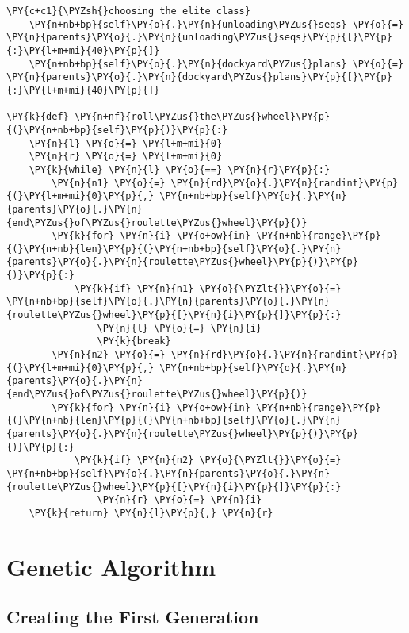 \begin{tcolorbox}[breakable, size=fbox, boxrule=1pt, pad at break*=1mm,colback=cellbackground, colframe=cellborder]
\begin{Verbatim}[commandchars=\\\{\}]
    \PY{c+c1}{\PYZsh{}choosing the elite class}
    \PY{n+nb+bp}{self}\PY{o}{.}\PY{n}{unloading\PYZus{}seqs} \PY{o}{=} \PY{n}{parents}\PY{o}{.}\PY{n}{unloading\PYZus{}seqs}\PY{p}{[}\PY{p}{:}\PY{l+m+mi}{40}\PY{p}{]}
    \PY{n+nb+bp}{self}\PY{o}{.}\PY{n}{dockyard\PYZus{}plans} \PY{o}{=} \PY{n}{parents}\PY{o}{.}\PY{n}{dockyard\PYZus{}plans}\PY{p}{[}\PY{p}{:}\PY{l+m+mi}{40}\PY{p}{]}

\PY{k}{def} \PY{n+nf}{roll\PYZus{}the\PYZus{}wheel}\PY{p}{(}\PY{n+nb+bp}{self}\PY{p}{)}\PY{p}{:}
    \PY{n}{l} \PY{o}{=} \PY{l+m+mi}{0}
    \PY{n}{r} \PY{o}{=} \PY{l+m+mi}{0}
    \PY{k}{while} \PY{n}{l} \PY{o}{==} \PY{n}{r}\PY{p}{:}
        \PY{n}{n1} \PY{o}{=} \PY{n}{rd}\PY{o}{.}\PY{n}{randint}\PY{p}{(}\PY{l+m+mi}{0}\PY{p}{,} \PY{n+nb+bp}{self}\PY{o}{.}\PY{n}{parents}\PY{o}{.}\PY{n}{end\PYZus{}of\PYZus{}roulette\PYZus{}wheel}\PY{p}{)}
        \PY{k}{for} \PY{n}{i} \PY{o+ow}{in} \PY{n+nb}{range}\PY{p}{(}\PY{n+nb}{len}\PY{p}{(}\PY{n+nb+bp}{self}\PY{o}{.}\PY{n}{parents}\PY{o}{.}\PY{n}{roulette\PYZus{}wheel}\PY{p}{)}\PY{p}{)}\PY{p}{:}
            \PY{k}{if} \PY{n}{n1} \PY{o}{\PYZlt{}}\PY{o}{=} \PY{n+nb+bp}{self}\PY{o}{.}\PY{n}{parents}\PY{o}{.}\PY{n}{roulette\PYZus{}wheel}\PY{p}{[}\PY{n}{i}\PY{p}{]}\PY{p}{:}
                \PY{n}{l} \PY{o}{=} \PY{n}{i}
                \PY{k}{break}
        \PY{n}{n2} \PY{o}{=} \PY{n}{rd}\PY{o}{.}\PY{n}{randint}\PY{p}{(}\PY{l+m+mi}{0}\PY{p}{,} \PY{n+nb+bp}{self}\PY{o}{.}\PY{n}{parents}\PY{o}{.}\PY{n}{end\PYZus{}of\PYZus{}roulette\PYZus{}wheel}\PY{p}{)}
        \PY{k}{for} \PY{n}{i} \PY{o+ow}{in} \PY{n+nb}{range}\PY{p}{(}\PY{n+nb}{len}\PY{p}{(}\PY{n+nb+bp}{self}\PY{o}{.}\PY{n}{parents}\PY{o}{.}\PY{n}{roulette\PYZus{}wheel}\PY{p}{)}\PY{p}{)}\PY{p}{:}
            \PY{k}{if} \PY{n}{n2} \PY{o}{\PYZlt{}}\PY{o}{=} \PY{n+nb+bp}{self}\PY{o}{.}\PY{n}{parents}\PY{o}{.}\PY{n}{roulette\PYZus{}wheel}\PY{p}{[}\PY{n}{i}\PY{p}{]}\PY{p}{:}
                \PY{n}{r} \PY{o}{=} \PY{n}{i}
    \PY{k}{return} \PY{n}{l}\PY{p}{,} \PY{n}{r}
\end{Verbatim}
\end{tcolorbox}

\section*{Genetic Algorithm}\label{genetic-algorithm}

\subsection*{Creating the First
Generation}\label{creating-the-first-generation}

